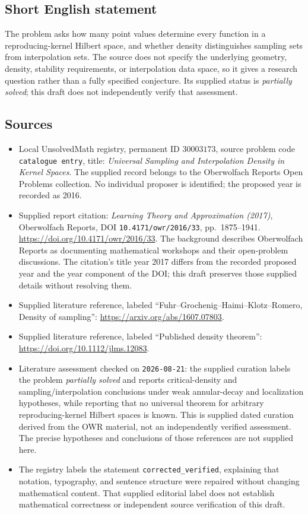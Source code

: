 \documentclass[11pt]{article}
\begin{document}
\subsection{Short English statement}
The problem asks how many point values determine every function in a reproducing-kernel Hilbert space, and whether density distinguishes sampling sets from interpolation sets. The source does not specify the underlying geometry, density, stability requirements, or interpolation data space, so it gives a research question rather than a fully specified conjecture. Its supplied status is \emph{partially solved}; this draft does not independently verify that assessment.
\subsection{Sources}
\begin{itemize}
\item Local UnsolvedMath registry, permanent ID \(30003173\), source problem code \texttt{catalogue entry}, title: \emph{Universal Sampling and Interpolation Density in Kernel Spaces}. The supplied record belongs to the Oberwolfach Reports Open Problems collection. No individual proposer is identified; the proposed year is recorded as 2016.
\item Supplied report citation: \emph{Learning Theory and Approximation (2017)}, Oberwolfach Reports, DOI \texttt{10.4171/owr/2016/33}, pp.\ 1875--1941. \url{https://doi.org/10.4171/owr/2016/33}. The background describes Oberwolfach Reports as documenting mathematical workshops and their open-problem discussions. The citation's title year 2017 differs from the recorded proposed year and the year component of the DOI; this draft preserves those supplied details without resolving them.
\item Supplied literature reference, labeled ``Fuhr--Grochenig--Haimi--Klotz--Romero, Density of sampling'': \url{https://arxiv.org/abs/1607.07803}.
\item Supplied literature reference, labeled ``Published density theorem'': \url{https://doi.org/10.1112/jlms.12083}.
\item Literature assessment checked on \texttt{2026-08-21}: the supplied curation labels the problem \emph{partially solved} and reports critical-density and sampling/interpolation conclusions under weak annular-decay and localization hypotheses, while reporting that no universal theorem for arbitrary reproducing-kernel Hilbert spaces is known. This is supplied dated curation derived from the OWR material, not an independently verified assessment. The precise hypotheses and conclusions of those references are not supplied here.
\item The registry labels the statement \texttt{corrected\_verified}, explaining that notation, typography, and sentence structure were repaired without changing mathematical content. That supplied editorial label does not establish mathematical correctness or independent source verification of this draft.
\end{itemize}
\end{document}
